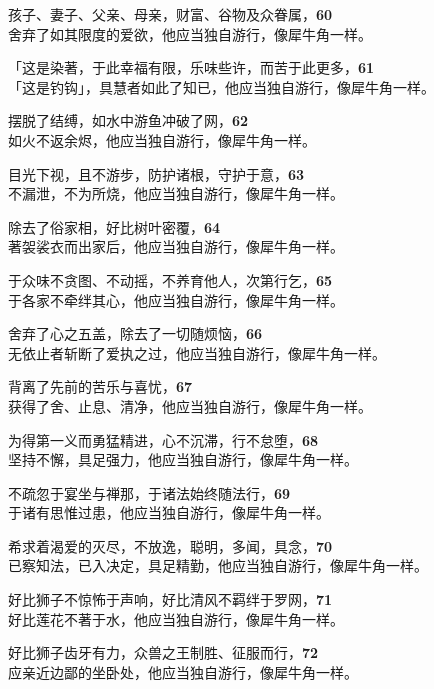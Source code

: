 孩子、妻子、父亲、母亲，财富、谷物及众眷属，\hfill{\grayfootnotesize \textbf{60}} \\
舍弃了如其限度的爱欲，他应当独自游行，像犀牛角一样。


「这是染著，于此幸福有限，乐味些许，而苦于此更多，\hfill{\grayfootnotesize \textbf{61}} \\
「这是钓钩」，具慧者如此了知已，他应当独自游行，像犀牛角一样。


摆脱了结缚，如水中游鱼冲破了网，\hfill{\grayfootnotesize \textbf{62}} \\
如火不返余烬，他应当独自游行，像犀牛角一样。


目光下视，且不游步，防护诸根，守护于意，\hfill{\grayfootnotesize \textbf{63}} \\
不漏泄，不为所烧，他应当独自游行，像犀牛角一样。


除去了俗家相，好比树叶密覆，\hfill{\grayfootnotesize \textbf{64}} \\
著袈裟衣而出家后，他应当独自游行，像犀牛角一样。


于众味不贪图、不动摇，不养育他人，次第行乞，\hfill{\grayfootnotesize \textbf{65}} \\
于各家不牵绊其心，他应当独自游行，像犀牛角一样。


舍弃了心之五盖，除去了一切随烦恼，\hfill{\grayfootnotesize \textbf{66}} \\
无依止者斩断了爱执之过，他应当独自游行，像犀牛角一样。


背离了先前的苦乐与喜忧，\hfill{\grayfootnotesize \textbf{67}} \\
获得了舍、止息、清净，他应当独自游行，像犀牛角一样。


为得第一义而勇猛精进，心不沉滞，行不怠堕，\hfill{\grayfootnotesize \textbf{68}} \\
坚持不懈，具足强力，他应当独自游行，像犀牛角一样。


不疏忽于宴坐与禅那，于诸法始终随法行，\hfill{\grayfootnotesize \textbf{69}} \\
于诸有思惟过患，他应当独自游行，像犀牛角一样。


希求着渴爱的灭尽，不放逸，聪明，多闻，具念，\hfill{\grayfootnotesize \textbf{70}} \\
已察知法，已入决定，具足精勤，他应当独自游行，像犀牛角一样。


好比狮子不惊怖于声响，好比清风不羁绊于罗网，\hfill{\grayfootnotesize \textbf{71}} \\
好比莲花不著于水，他应当独自游行，像犀牛角一样。


好比狮子齿牙有力，众兽之王制胜、征服而行，\hfill{\grayfootnotesize \textbf{72}} \\
应亲近边鄙的坐卧处，他应当独自游行，像犀牛角一样。


